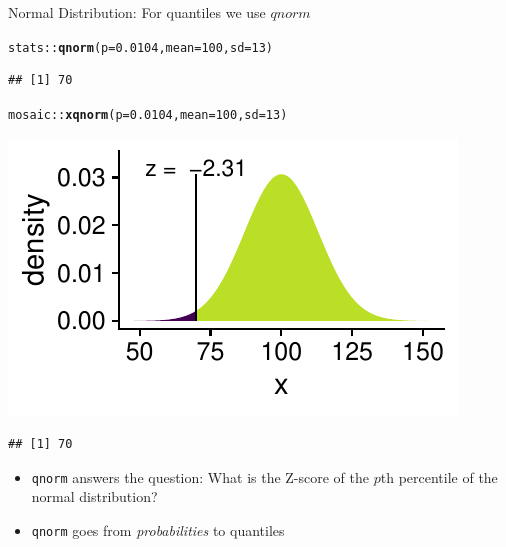 \documentclass[10pt,handout]{beamer}\usepackage[]{graphicx}\usepackage[]{color}
\makeatletter
\newcommand{\hlnum}[1]{\textcolor[rgb]{0.686,0.059,0.569}{#1}}%
\newcommand{\hlopt}[1]{\textcolor[rgb]{0,0,0}{#1}}%
\newcommand{\hlstd}[1]{\textcolor[rgb]{0.345,0.345,0.345}{#1}}%
\newcommand{\hlkwc}[1]{\textcolor[rgb]{0.333,0.667,0.333}{#1}}%
\newcommand{\hlkwd}[1]{\textcolor[rgb]{0.737,0.353,0.396}{\textbf{#1}}}%
\newenvironment{kframe}{%
 \def\at@end@of@kframe{}%
 \ifinner\ifhmode%
  \def\at@end@of@kframe{\end{minipage}}%
  \begin{minipage}{\columnwidth}%
 \fi\fi%
 \def\FrameCommand##1{\hskip\@totalleftmargin \hskip-\fboxsep
 \colorbox{shadecolor}{##1}\hskip-\fboxsep
     \hskip-\linewidth \hskip-\@totalleftmargin \hskip\columnwidth}%
 \MakeFramed {\advance\hsize-\width
   \@totalleftmargin\z@ \linewidth\hsize
   \@setminipage}}%
 {\par\unskip\endMakeFramed%
 \at@end@of@kframe}
\newenvironment{knitrout}{}{} %
\makeatother
\begin{document}
\begin{frame}[fragile]{Normal Distribution: For quantiles we use $qnorm$}
	
	
	
\begin{knitrout}\tiny
{}\color{fgcolor}\begin{kframe}
\begin{alltt}
\hlstd{stats}\hlopt{::}\hlkwd{qnorm}\hlstd{(}\hlkwc{p} \hlstd{=} \hlnum{0.0104}\hlstd{,} \hlkwc{mean} \hlstd{=} \hlnum{100}\hlstd{,} \hlkwc{sd} \hlstd{=} \hlnum{13}\hlstd{)}
\end{alltt}
\begin{verbatim}
## [1] 70
\end{verbatim}
\end{kframe}
\end{knitrout}
	
	
	
\begin{knitrout}\tiny
{}\color{fgcolor}\begin{kframe}
\begin{alltt}
\hlstd{mosaic}\hlopt{::}\hlkwd{xqnorm}\hlstd{(}\hlkwc{p} \hlstd{=} \hlnum{0.0104}\hlstd{,} \hlkwc{mean} \hlstd{=} \hlnum{100}\hlstd{,} \hlkwc{sd} \hlstd{=} \hlnum{13}\hlstd{)}
\end{alltt}
\end{kframe}

{\centering \includegraphics[width=0.6\linewidth]{figure/probs5-1} 

}


\begin{kframe}\begin{verbatim}
## [1] 70
\end{verbatim}
\end{kframe}
\end{knitrout}
	
	
	
	\small{
		\begin{itemize}
			\item \texttt{qnorm} answers the question: What is the Z-score of the $p$th percentile of the normal distribution?
			
			\item \texttt{qnorm} goes from \textit{probabilities} to quantiles 
		\end{itemize}
	}
\end{frame}
\end{document}
